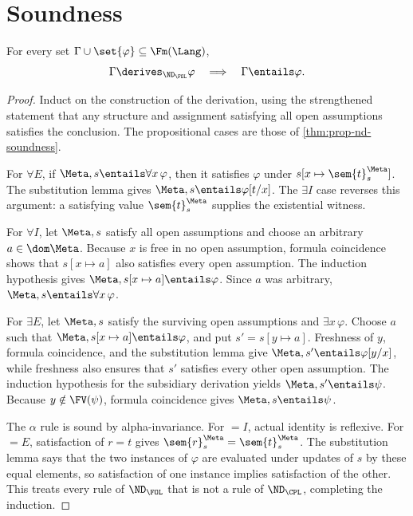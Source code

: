 \section{Soundness}
\label{sec:fol-deduction-03}

\begin{theorem}
\label{thm:fol-soundness}
For every set \(\Gamma\cup\set{\varphi}\subseteq\Fm(\Lang)\),
\[
 \Gamma\derives_{\ND_{\FOL}}\varphi
 \quad\Longrightarrow\quad
 \Gamma\entails\varphi.
\]
\end{theorem}
\begin{proof}
Induct on the construction of the derivation, using the strengthened statement
that any structure and assignment satisfying all open assumptions satisfies
the conclusion.  The propositional cases are those of
\cref{thm:prop-nd-soundness}.

For \(\forall E\), if \(\Meta,s\entails\forall x\,\varphi\), then it
satisfies \(\varphi\) under
\(s[x\mapsto\sem{t}^{\Meta}_s]\).  The substitution lemma gives
\(\Meta,s\entails\varphi[t/x]\).  The \(\exists I\) case reverses this
argument: a satisfying value \(\sem{t}^{\Meta}_s\) supplies the existential
witness.

For \(\forall I\), let \(\Meta,s\) satisfy all open assumptions and choose an
arbitrary \(a\in\dom\Meta\).  Because \(x\) is free in no open assumption,
formula coincidence shows that \(s[x\mapsto a]\) also satisfies every open
assumption.  The induction hypothesis gives
\(\Meta,s[x\mapsto a]\entails\varphi\).  Since \(a\) was arbitrary,
\(\Meta,s\entails\forall x\,\varphi\).

For \(\exists E\), let \(\Meta,s\) satisfy the surviving open assumptions and
\(\exists x\,\varphi\).  Choose \(a\) such that
\(\Meta,s[x\mapsto a]\entails\varphi\), and put
\(s'=s[y\mapsto a]\).  Freshness of \(y\), formula coincidence, and the
substitution lemma give \(\Meta,s'\entails\varphi[y/x]\), while freshness also
ensures that \(s'\) satisfies every other open assumption.  The induction
hypothesis for the subsidiary derivation yields \(\Meta,s'\entails\psi\).
Because \(y\notin\FV(\psi)\), formula coincidence gives
\(\Meta,s\entails\psi\).

The \(\alpha\) rule is sound by alpha-invariance.  For \(=I\), actual
identity is reflexive.  For \(=E\), satisfaction of
\(r=t\) gives
\(\sem{r}^{\Meta}_s=\sem{t}^{\Meta}_s\).  The substitution lemma says that
the two instances of \(\varphi\) are evaluated under updates of \(s\) by
these equal elements, so satisfaction of one instance implies satisfaction of
the other.  This treats every rule of \(\ND_{\FOL}\) that is not a rule
of \(\ND_{\CPL}\), completing the induction.
\end{proof}

